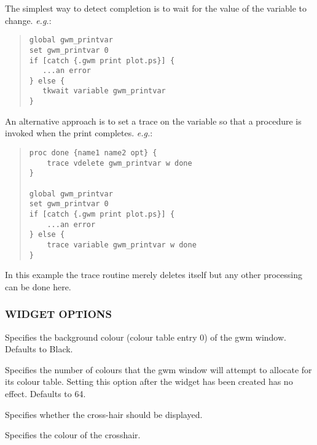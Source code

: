 The simplest way to detect completion is to wait for the value of the
variable to change. {\em{e.g.}}:

\begin{quote}
\begin{verbatim}
global gwm_printvar
set gwm_printvar 0
if [catch {.gwm print plot.ps}] {
   ...an error
} else {
   tkwait variable gwm_printvar
}
\end{verbatim}
\end{quote}

An alternative approach is to set a trace on the variable so that a
procedure is invoked when the print completes. {\em{e.g.}}:

\begin{quote}
\begin{verbatim}
proc done {name1 name2 opt} {
    trace vdelete gwm_printvar w done
}

global gwm_printvar
set gwm_printvar 0
if [catch {.gwm print plot.ps}] {
    ...an error
} else {
    trace variable gwm_printvar w done
}
\end{verbatim}
\end{quote}

In this example the trace routine merely deletes itself but any other
processing can be done here.

\subsubsection{WIDGET OPTIONS}

\begin{rquote}
Specifies the background colour (colour table entry 0) of the gwm window.
Defaults to Black.
\end{rquote}

\begin{rquote}
Specifies the number of colours that the gwm window will attempt to allocate
for its colour table. Setting this option after the widget has been created
has no effect. Defaults to 64.
\end{rquote}

\begin{rquote}
Specifies whether the cross-hair should be displayed.
\end{rquote}

\begin{rquote}
Specifies the colour of the crosshair.
\end{rquote}

